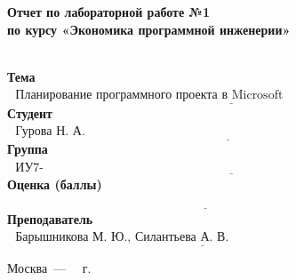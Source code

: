 \begin{titlepage}
	
	\begin{center}
		\Large\textbf{Отчет по лабораторной работе №1}\\
		\Large\textbf{по курсу «Экономика программной инженерии»}\\
		~\\
	\end{center}
	
	\noindent\textbf{Тема} $\underline{\text{~~Планирование программного проекта в Microsoft Project~~~~~~~~~~~~~~~~~~~~~~~~~~~~~~~~~}}$\newline\newline
	\noindent\textbf{Студент} $\underline{\text{~~Гурова Н. А.~~~~~~~~~~~~~~~~~~~~~~~~~~~~~~~~~~~~~~~~~~~~~~~~~~~~~~~~~~~~~~~~~~~~~~~~~~~~~~~~~~~~~~~~}}$\newline\newline
	\noindent\textbf{Группа} $\underline{\text{~~ИУ7-84Б~~~~~~~~~~~~~~~~~~~~~~~~~~~~~~~~~~~~~~~~~~~~~~~~~~~~~~~~~~~~~~~~~~~~~~~~~~~~~~~~~~~~~~~~~~~~~~~}}$\newline\newline
	\noindent\textbf{Оценка (баллы)} $\underline{\text{ ~~~~~~~~~~~~~~~~~~~~~~~~~~~~~~~~~~~~~~~~~~~~~~~~~~~~~~~~~~~~~~~~~~~~~~~~~~~~~~~~~~~~~~~~~~~~~~~}}$\newline\newline
	\noindent\textbf{Преподаватель} $\underline{\text{~~Барышникова М. Ю., Силантьева А. В.~~~~~~~~~~~~~~~~~~~~~~~~~~~~~~~~~~~~~~~~~}}$\newline
	
	\begin{center}
		\vfill
		Москва~---~\the\year
		~г.
	\end{center}
	\restoregeometry
\end{titlepage}

